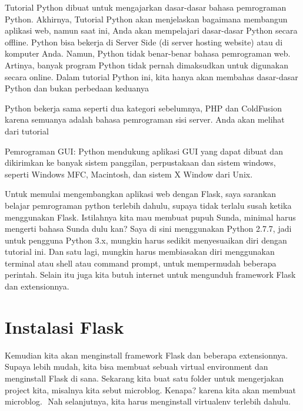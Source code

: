 {{{\vspace{14pt}
\noindent
{\fontsize{14pt}{14pt}\selectfont Tutorial Python dibuat untuk mengajarkan dasar-dasar bahasa pemrograman Python. Akhirnya, Tutorial Python akan menjelaskan bagaimana membangun aplikasi web, namun saat ini, Anda akan mempelajari dasar-dasar Python secara offline. Python bisa bekerja di Server Side (di server hosting website) atau di komputer Anda. Namun, Python tidak benar-benar bahasa pemrograman web. Artinya, banyak program Python tidak pernah dimaksudkan untuk digunakan secara online. Dalam tutorial Python ini, kita hanya akan membahas dasar-dasar Python dan bukan perbedaan keduanya \\} \par
\vspace{14pt}
\noindent
{\fontsize{14pt}{14pt}\selectfont Python bekerja sama seperti dua kategori sebelumnya, PHP dan ColdFusion karena semuanya adalah bahasa pemrograman sisi server. Anda akan melihat dari tutorial \\} \par
\noindent
{\fontsize{14pt}{14pt}\selectfont Pemrograman GUI: Python mendukung aplikasi GUI yang dapat dibuat dan dikirimkan ke banyak sistem panggilan, perpustakaan dan sistem windows, seperti Windows MFC, Macintosh, dan sistem X Window dari Unix. \\} \par
\vspace{14pt}
\noindent
{\fontsize{14pt}{14pt}\selectfont Untuk memulai mengembangkan aplikasi web dengan Flask, saya sarankan belajar pemrograman python terlebih dahulu, supaya tidak terlalu susah ketika menggunakan Flask. Istilahnya kita mau membuat pupuh Sunda, minimal harus mengerti bahasa Sunda dulu kan? Saya di sini menggunakan Python 2.7.7, jadi untuk pengguna Python 3.x, mungkin harus sedikit menyesuaikan diri dengan tutorial ini. Dan satu lagi, mungkin harus membiasakan diri menggunakan terminal atau shell atau command prompt, untuk mempermudah beberapa perintah. Selain itu juga kita butuh internet untuk mengunduh framework Flask dan extensionnya. \\} \par
\noindent
{\fontsize{14pt}{14pt}\section {Instalasi Flask}
\noindent
{\fontsize{14pt}{14pt}\selectfont Kemudian kita akan menginstall framework Flask dan beberapa extensionnya. Supaya lebih mudah, kita bisa membuat sebuah virtual environment dan menginstall Flask di sana. Sekarang kita buat satu folder untuk mengerjakan project kita, misalnya kita sebut microblog. Kenapa? karena kita akan membuat microblog. $  $ $  $Nah selanjutnya, kita harus menginstall virtualenv terlebih dahulu. \\} \par
}}}}
